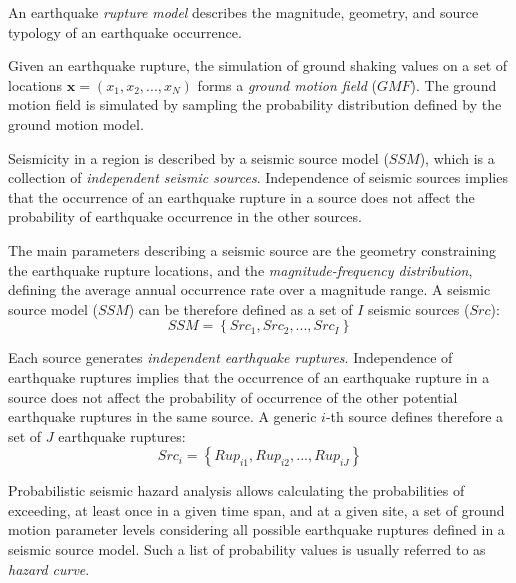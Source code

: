 
An earthquake \textit{rupture model} describes the magnitude, geometry, and source typology of an earthquake occurrence.

Given an earthquake rupture, the simulation of ground shaking values on a set of locations $\bm{x}=(x_{1}, x_{2}, ..., x_{N})$
forms a \textit{ground motion field} ($GMF$). The ground motion field is simulated by sampling the probability distribution defined by the ground motion model.

Seismicity in a region is described by a seismic source model ($SSM$), which is a collection of \textit{independent seismic sources}. Independence of seismic sources implies that the occurrence of an earthquake rupture in a source does not affect the probability of earthquake occurrence in the other sources.

The main parameters describing a seismic source are the geometry constraining the earthquake rupture locations, and the \textit{magnitude-frequency distribution}, defining the average annual occurrence rate over a magnitude range. A seismic source model ($SSM$) can be therefore defined as a set of $I$ seismic sources ($Src$):
\begin{equation}
SSM = \left\{Src_{1}, Src_{2}, ..., Src_{I}\right\}
\end{equation}

Each source generates \textit{independent earthquake ruptures}. Independence of earthquake ruptures implies that the occurrence of an earthquake rupture in a source does not affect the probability of occurrence of the other potential earthquake ruptures in the same source. A generic $i$-th source defines therefore a set of $J$ earthquake ruptures:
\begin{equation}
Src_{i} = \left\{Rup_{i1}, Rup_{i2}, ..., Rup_{iJ}\right\}
\end{equation}





Probabilistic seismic hazard analysis allows calculating the probabilities of exceeding,
at least once in a given time span, and at a given site, a set of ground motion
parameter levels considering all possible earthquake ruptures defined in a
seismic source model. Such a list of probability values is usually referred to
as \textit{hazard curve}.

